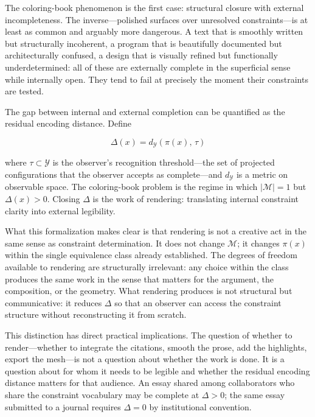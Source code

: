 \documentclass[11pt, twoside]{article}
\theoremstyle{plain}
\theoremstyle{definition}
\theoremstyle{remark}
\begin{document}
The coloring-book phenomenon is the first case: structural closure with external incompleteness. The inverse---polished surfaces over unresolved constraints---is at least as common and arguably more dangerous. A text that is smoothly written but structurally incoherent, a program that is beautifully documented but architecturally confused, a design that is visually refined but functionally underdetermined: all of these are externally complete in the superficial sense while internally open. They tend to fail at precisely the moment their constraints are tested.

The gap between internal and external completion can be quantified as the residual encoding distance. Define

\[
\Delta(x) = d_{\mathcal{Y}}(\pi(x),\, \tau)
\]

where $\tau \subset \mathcal{Y}$ is the observer's recognition threshold---the set of projected configurations that the observer accepts as complete---and $d_{\mathcal{Y}}$ is a metric on observable space. The coloring-book problem is the regime in which $|\mathcal{M}| = 1$ but $\Delta(x) > 0$. Closing $\Delta$ is the work of rendering: translating internal constraint clarity into external legibility.

What this formalization makes clear is that rendering is not a creative act in the same sense as constraint determination. It does not change $\mathcal{M}$; it changes $\pi(x)$ within the single equivalence class already established. The degrees of freedom available to rendering are structurally irrelevant: any choice within the class produces the same work in the sense that matters for the argument, the composition, or the geometry. What rendering produces is not structural but communicative: it reduces $\Delta$ so that an observer can access the constraint structure without reconstructing it from scratch.

This distinction has direct practical implications. The question of whether to render---whether to integrate the citations, smooth the prose, add the highlights, export the mesh---is not a question about whether the work is done. It is a question about for whom it needs to be legible and whether the residual encoding distance matters for that audience. An essay shared among collaborators who share the constraint vocabulary may be complete at $\Delta > 0$; the same essay submitted to a journal requires $\Delta = 0$ by institutional convention.

\end{document}
